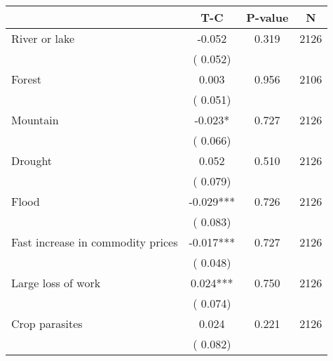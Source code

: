 
\begin{tabular}{l*{3}{c}}\hline&\multicolumn{1}{c}{T-C}&\multicolumn{1}{c}{P-value}&\multicolumn{1}{c}{N} \\ \hline
 River or lake                 &             -0.052          &        0.319 & 2126          \\ 
                               &        (       0.052)             &                        &                              \\ 
 Forest                 &              0.003          &        0.956 & 2106          \\ 
                               &        (       0.051)             &                        &                              \\ 
 Mountain                 &             -0.023*          &        0.727 & 2126          \\ 
                               &        (       0.066)             &                        &                              \\ 
 Drought                 &              0.052          &        0.510 & 2126          \\ 
                               &        (       0.079)             &                        &                              \\ 
 Flood                 &             -0.029***          &        0.726 & 2126          \\ 
                               &        (       0.083)             &                        &                              \\ 
 Fast increase in commodity prices                 &             -0.017***          &        0.727 & 2126          \\ 
                               &        (       0.048)             &                        &                              \\ 
 Large loss of work                 &              0.024***          &        0.750 & 2126          \\ 
                               &        (       0.074)             &                        &                              \\ 
 Crop parasites                 &              0.024          &        0.221 & 2126          \\ 
                               &        (       0.082)             &                        &                              \\ 

\end{tabular}
